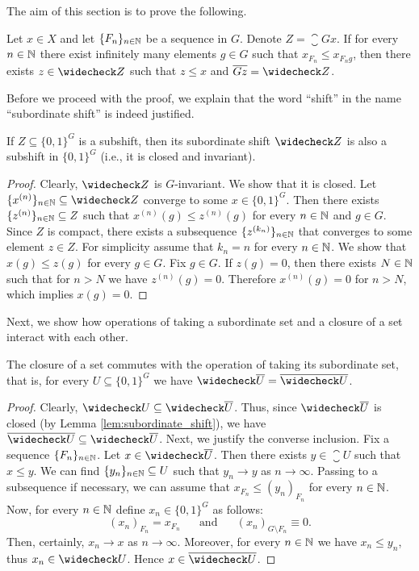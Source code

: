 \noindent
The aim of this section is to prove the following.

\begin{lem}\label{lem:subord-transit2}
Let $x\in X$ and let $\{F_n\}_{n\in\mathbb{N}}$ be a \Folner sequence in $G$. Denote  $Z=\closure{Gx}$. If for every $n\in\mathbb{N}$ there exist infinitely many elements $g\in G$ such that $x_{F_n}\leq x_{F_ng}$, then there exists $z\in\subord{Z}$ such that $z\leq x$ and $\closure{Gz}=\subord{Z}$. 
\end{lem}

\noindent
Before we proceed with the proof, we explain that the word ``shift'' in the name ``subordinate shift'' is indeed justified.
\begin{lem}\label{lem:subordinate_shift}
If $Z\subseteq\{0,1\}^G$ is a subshift, then its subordinate shift $\subord{Z}$ is also a subshift in $\{0,1\}^G$ (i.e., it is closed and invariant).
\end{lem}

\begin{proof}
Clearly, $\subord{Z}$ is $G$-invariant. We show that it is closed. Let $\{x^{(n)}\}_{n\in\N}\subseteq \subord{Z}$ converge to some $x\in\{0,1\}^G$. Then there exists $\{z^{(n)}\}_{n\in\mathbb{N}}\subseteq Z$ such that $x^{(n)}(g)\leq z^{(n)}(g)$ for every $n\in\mathbb{N}$ and $g\in G$. Since $Z$ is compact, there exists a subsequence $\{z^{(k_n)}\}_{n\in\mathbb{N}}$ that converges to some element $z\in Z$. For simplicity assume that $k_n=n$ for every $n\in\mathbb{N}$. We show that $x(g)\leq z(g)$ for every $g\in G$. Fix $g\in G$. If $z(g)=0$, then there exists $N\in\mathbb{N}$ such that for $n>N$ we have $z^{(n)}(g)=0$. Therefore $x^{(n)}(g)=0$ for $n>N$, which implies $x(g)=0$.
\end{proof}

\noindent
Next, we show how operations of taking a subordinate set and a closure of a set interact with each other.
\begin{lem}\label{lem:subord-closure-comute}
The closure of a set commutes with the operation of taking its subordinate set, that is, for every $U\subseteq \{0,1\}^G$ we have $\subord{\closure{ U}}=\closure{\subord{ U}}$.
\end{lem}

\begin{proof}
Clearly, $\subord{U}\subseteq \subord{\closure{ U}}$. Thus, since $\subord{\closure{ U}}$ is closed (by Lemma \ref{lem:subordinate_shift}), we have $\closure{\subord{ U}}\subseteq \subord{\closure{ U}}$. 
%
Next, we justify the converse inclusion. Fix a \Folner sequence $\{F_n\}_{n\in\mathbb{N}}$. Let $x\in \subord{\closure{ U}}$. Then there exists $y\in\closure U$ such that $x\leq y$. We can find $\{y_n\}_{n\in\mathbb{N}}\subseteq U$ such that $y_n\to y$ as $n\to\infty$. Passing to a subsequence if necessary, we can assume that $x_{F_n}\leq (y_n)_{F_n}$ for every $n\in\mathbb{N}$. Now, for every $n\in \mathbb{N}$ define $x_n\in\{0,1\}^G$ as follows: 
\[
(x_n)_{F_n}=x_{F_n}~~~~~~\mbox{ and }~~~~~~ (x_n)_{G\setminus F_n}\equiv 0.
\]
Then, certainly, $x_n\to x$ as $n\to\infty$. Moreover,  for every $n\in\mathbb{N}$ we have $x_n\leq y_n$, thus $x_n\in\subord{U}$. Hence $x\in \closure{\subord{ U}}$.
\end{proof}

